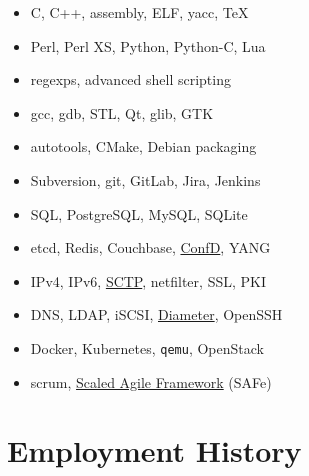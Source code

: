 \documentclass[a4paper,12pt]{article}
\newcommand{\compress}{\setlength\itemsep{-\parskip}}
\newenvironment{compressedItemize}{\begin{itemize}\compress}{\end{itemize}}
\begin{document}
\begin{multicols}{2}
\begin{compressedItemize}
\item	C, C++, assembly, ELF, yacc, \TeX
\item	Perl, Perl XS, Python, Python-C, Lua
\item	regexps, advanced shell scripting
\item	gcc, gdb, STL, Qt, glib, GTK
\item	autotools, CMake, Debian packaging
\item	Subversion, git, GitLab, Jira, Jenkins
\columnbreak
\item	SQL, PostgreSQL, MySQL, SQLite
\item	etcd, Redis, Couchbase,
	\href{https://www.tail-f.com/confd-basic/}{ConfD}, YANG
\item	IPv4, IPv6, \href{https://en.wikipedia.org/wiki/SCTP}{SCTP}, netfilter,
	SSL, PKI
\item	DNS, LDAP, iSCSI, \href{https://tools.ietf.org/html/rfc6733}{Diameter},
	OpenSSH
\item	Docker, Kubernetes, \texttt{qemu}, OpenStack
\item	scrum,
	\href{https://en.wikipedia.org/wiki/SAFe}{Scaled Agile Framework} (SAFe)
\end{compressedItemize}
\end{multicols}

\section{Employment History}
\end{document}
